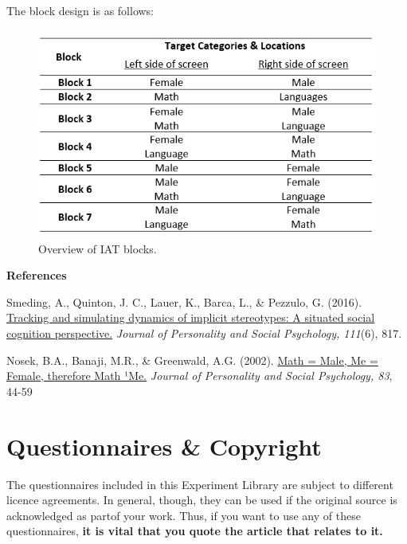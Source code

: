 \documentclass[
]{book}
\begin{document}
The block design is as follows:

\begin{figure}

{\centering \includegraphics[width=0.75\linewidth]{images/IAT_Design} 

}

\caption{Overview of IAT blocks.}\label{fig:Figure6-1}
\end{figure}

\textbf{References}

Smeding, A., Quinton, J. C., Lauer, K., Barca, L., \& Pezzulo, G. (2016). \href{https://www.researchgate.net/profile/Jean-Charles_Quinton/publication/308341625_Tracking_and_Simulating_Dynamics_of_Implicit_Stereotypes_A_Situated_Social_Cognition_Perspective/links/581b4c3508aea429b28fc0d0/Tracking-and-Simulating-Dynamics-of-Implicit-Stereotypes-A-Situated-Social-Cognition-Perspective.pdf}{Tracking and simulating dynamics of implicit stereotypes: A situated social cognition perspective.} \emph{Journal of Personality and Social Psychology, 111}(6), 817.

Nosek, B.A., Banaji, M.R., \& Greenwald, A.G. (2002). \href{https://psyarxiv.com/y2g6s}{Math = Male, Me = Female, therefore Math ¹Me.} \emph{Journal of Personality and Social Psychology, 83}, 44-59

\hypertarget{questionnaires-copyright}{%
\chapter{Questionnaires \& Copyright}\label{questionnaires-copyright}}

The questionnaires included in this Experiment Library are subject to different licence agreements. In general, though, they can be used if the original source is acknowledged as partof your work. Thus, if you want to use any of these questionnaires, \textbf{it is vital that you quote the article that relates to it.}
\end{document}
